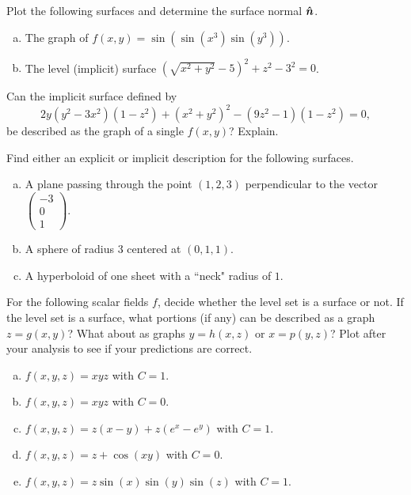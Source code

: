 \documentclass[12pt]{article} %
\begin{document}
\begin{problem}
    Plot the following surfaces and determine the surface normal $\boldsymbol{\hat{n}}$.
\begin{enumerate}[(a)]
    \item The graph of $f(x,y)=\sin(\sin(x^3)\sin(y^3))$.
    \item The level (implicit) surface $\left(\sqrt{x^2+y^2}-5\right)^2 + z^2 - 3^2 = 0$.
\end{enumerate}
\end{problem}

\begin{problem}
    Can the implicit surface defined by
    \[
        2y(y^2-3x^2)(1-z^2)+(x^2+y^2)^2-(9z^2-1)(1-z^2)=0,
    \]
    be described as the graph of a single $f(x,y)$? Explain.
\end{problem}

\begin{problem}
    Find either an explicit or implicit description for the following surfaces. 
\begin{enumerate}[(a)]
    \item A plane passing through the point $(1,2,3)$ perpendicular to the vector $\begin{pmatrix} -3 \\ 0 \\ 1 \end{pmatrix}$.
    \item A sphere of radius 3 centered at $(0,1,1)$.
    \item A hyperboloid of one sheet with a ``neck" radius of $1$.
\end{enumerate}
\end{problem}

\begin{problem}
    For the following scalar fields $f$, decide whether the level set is a surface or not. If the level set is a surface, what portions (if any) can be described as a graph $z=g(x,y)$?  What about as graphs $y=h(x,z)$ or $x=p(y,z)$? Plot after your analysis to see if your predictions are correct.
    \begin{enumerate}[(a)]
        \item $f(x,y,z)=xyz$ with $C=1$.
        \item $f(x,y,z)=xyz$ with $C=0$.
        \item $f(x,y,z) = z(x-y)+z(e^x-e^y)$ with $C=1$.
        \item $f(x,y,z) = z + \cos(xy)$ with $C=0$.
        \item $f(x,y,z) = z\sin(x)\sin(y)\sin(z)$ with $C=1$.
    \end{enumerate}
\end{problem}
\end{document}

